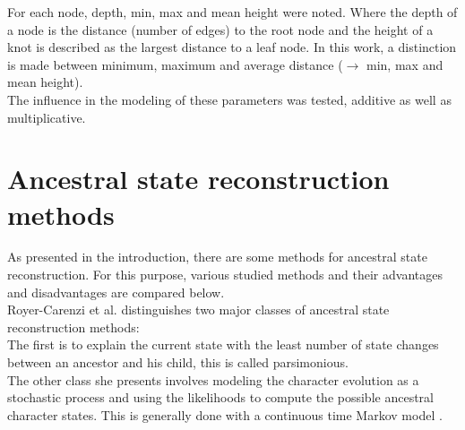       For each node, depth, min, max and mean height were noted. Where the depth of a node is the 
        distance (number of edges) to the root node and the height of a knot is described as the 
        largest distance to a leaf node. In this work, a distinction is made between minimum, maximum 
        and average distance ($\rightarrow$ min, max and mean height). \\
      The influence in the modeling of these parameters was tested, additive as well as multiplicative.


  \section{Ancestral state reconstruction methods}
    As presented in the introduction, there are some methods for ancestral state reconstruction. For 
      this purpose, various studied methods and their advantages and disadvantages are compared below. \\
  
  
    Royer-Carenzi et al. distinguishes two major classes of ancestral state reconstruction methods: \\
    The first is to explain the current state with the least number of state changes between an 
      ancestor and his child, this is called parsimonious. \\
    The other class she presents involves modeling the character evolution as a stochastic process and 
      using the likelihoods to compute the possible ancestral character states. This is generally done 
      with a continuous time Markov model \cite{RoyerCarenzi2013}. \\
     \\

